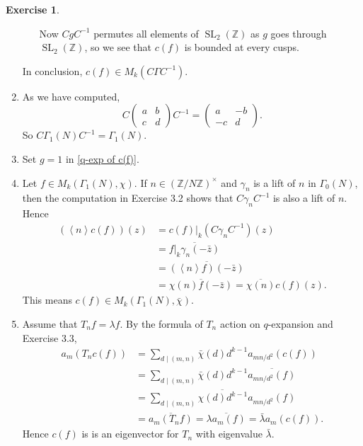 \documentclass{article}
\theoremstyle{definition}
\newtheorem{example}{Exercise}
\theoremstyle{remark}
\newcommand{\Z}{\mathbb{Z}}
\DeclareMathOperator{\SL}{SL}
\newcommand{\gene}[1]{\left\langle #1 \right\rangle} %
\begin{document}
\begin{example}
\begin{enumerate}
\begin{itemize}
Now $CgC^{-1}$ permutes all elements of $\SL_2(\Z)$ as $g$ goes through $\SL_2(\Z)$, so we see that $c(f)$ is bounded at every cusps.
    \end{itemize}
    In conclusion, $c(f)\in M_k(C\Gamma C^{-1})$.
    \item As we have computed,
    \[C\begin{pmatrix}
        a&b\\c&d
    \end{pmatrix} C^{-1} = \begin{pmatrix}
        a&-b\\ -c&d
    \end{pmatrix}.\]
    So $C\Gamma_1(N)C^{-1} = \Gamma_1(N)$.
    \item Set $g = 1$ in \cref{q-exp of c(f)}.
    \item Let $f\in M_k(\Gamma_1(N), \chi)$.
    If $n\in(\Z/N\Z)^\times$ and $\gamma_n $
    is a lift of $n$ in $\Gamma_0(N)$, then the computation in Exercise 3.2 shows that $C\gamma_n C^{-1}$ is also a lift of $n$. Hence
    \begin{align*}
        \left(\gene{n}c(f)\right)(z) &= c(f)|_k(C\gamma_n C^{-1})(z)\\ 
        &= \overline{f|_k\gamma_n(-\bar{z})}
        \\ &= \overline{\left(\gene{n}f\right)(-\bar{z})}
        \\ &= \overline{\chi(n)f(-\bar{z})} = 
        \overline{\chi(n)}c(f)(z).
    \end{align*}
    This means $c(f)\in M_k(\Gamma_1(N), \bar{\chi})$.

    \item Assume that $T_nf = \lambda f$.
    By the formula of $T_n$ action on $q$-expansion and Exercise 3.3,
    \begin{align*}
        a_m(T_nc(f)) &=
        \sum_{d\mid (m, n)} \bar\chi(d) d^{k-1}a_{mn/d^2}(c(f))\\ &
        =
        \sum_{d\mid (m, n)} \bar\chi(d) d^{k-1}\overline{a_{mn/d^2}(f)}\\ &
        = \overline{\sum_{d\mid (m, n)} \chi(d) d^{k-1}a_{mn/d^2}(f)}\\ &
        = \overline{a_m(T_nf)} = \overline{\lambda a_m(f)} = \bar{\lambda}a_m(c(f)).
    \end{align*}
    Hence $c(f)$ is is an eigenvector for $T_n$ with eigenvalue $\bar{\lambda}$.


\end{enumerate}
\end{example}
\end{document}
